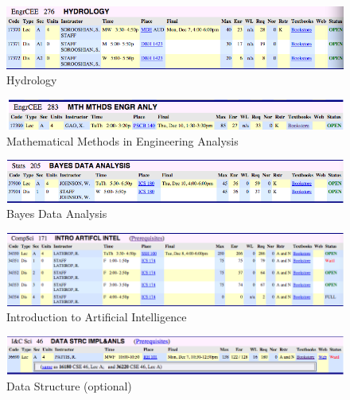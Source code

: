 \documentclass[landscape,letterpaper]{article}
\begin{document}
\begin{center}
\begin{figure}[H]
\centering
\includegraphics[width=16cm]{SOROOSH.png}
\captionsetup{labelformat=empty}
\caption{Hydrology}
\end{figure}


\begin{figure}[H]
\centering
\includegraphics[width=16cm]{XIAOGANGGAO.png}
\captionsetup{labelformat=empty}
\caption{Mathematical Methods in Engineering Analysis}
\end{figure}

\begin{figure}[H]
\centering
\includegraphics[width=16cm]{BAYES.png}
\captionsetup{labelformat=empty}
\caption{Bayes Data Analysis}
\end{figure}


\begin{figure}[H]
\centering
\includegraphics[width=16cm]{AI.png}
\captionsetup{labelformat=empty}
\caption{Introduction to Artificial Intelligence}
\end{figure}

\begin{center}
\begin{figure}[H]
\centering
\includegraphics[width=16cm]{data.png}
\captionsetup{labelformat=empty}
\caption{Data Structure (optional)}
\end{figure}


\end{center}
\end{center}
\end{document}
